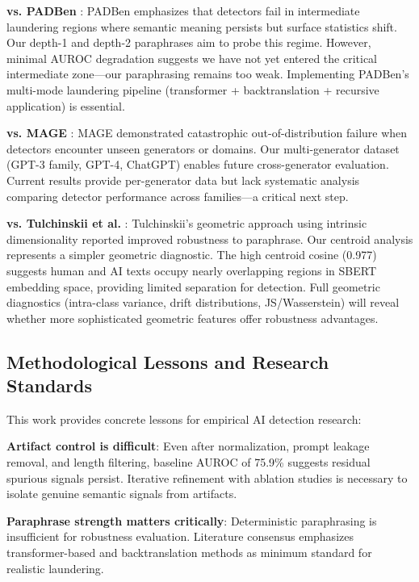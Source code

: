 \documentclass[conference]{IEEEtran}
\begin{document}
\textbf{vs. PADBen} \cite{zha2024padben}: PADBen emphasizes that detectors fail in intermediate laundering regions where semantic meaning persists but surface statistics shift. Our depth-1 and depth-2 paraphrases aim to probe this regime. However, minimal AUROC degradation suggests we have not yet entered the critical intermediate zone—our paraphrasing remains too weak. Implementing PADBen's multi-mode laundering pipeline (transformer + backtranslation + recursive application) is essential.

\textbf{vs. MAGE} \cite{li2024mage}: MAGE demonstrated catastrophic out-of-distribution failure when detectors encounter unseen generators or domains. Our multi-generator dataset (GPT-3 family, GPT-4, ChatGPT) enables future cross-generator evaluation. Current results provide per-generator data but lack systematic analysis comparing detector performance across families—a critical next step.

\textbf{vs. Tulchinskii et al.} \cite{tulchinskii2023intrinsic}: Tulchinskii's geometric approach using intrinsic dimensionality reported improved robustness to paraphrase. Our centroid analysis represents a simpler geometric diagnostic. The high centroid cosine (0.977) suggests human and AI texts occupy nearly overlapping regions in SBERT embedding space, providing limited separation for detection. Full geometric diagnostics (intra-class variance, drift distributions, JS/Wasserstein) will reveal whether more sophisticated geometric features offer robustness advantages.

\subsection{Methodological Lessons and Research Standards}

This work provides concrete lessons for empirical AI detection research:

\textbf{Artifact control is difficult}: Even after normalization, prompt leakage removal, and length filtering, baseline AUROC of 75.9\% suggests residual spurious signals persist. Iterative refinement with ablation studies is necessary to isolate genuine semantic signals from artifacts.

\textbf{Paraphrase strength matters critically}: Deterministic paraphrasing is insufficient for robustness evaluation. Literature consensus \cite{sadasivan2023can,krishna2023paraphrasing,zha2024padben} emphasizes transformer-based and backtranslation methods as minimum standard for realistic laundering.
\end{document}
